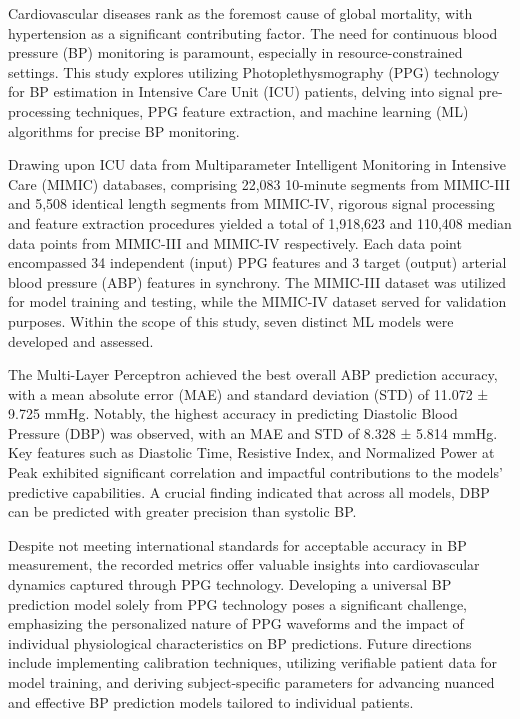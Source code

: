     Cardiovascular diseases rank as the foremost cause of global mortality, with hypertension as a significant contributing factor.
    The need for continuous blood pressure (BP) monitoring is paramount, especially in resource-constrained settings.
    This study explores utilizing Photoplethysmography (PPG) technology for BP estimation in Intensive Care Unit (ICU) patients, delving into signal pre-processing techniques,
    PPG feature extraction, and machine learning (ML) algorithms for precise BP monitoring.

    \vspace{0.4cm}

    Drawing upon ICU data from Multiparameter Intelligent Monitoring in Intensive Care (MIMIC) databases, comprising 22,083 10-minute segments from MIMIC-III and 5,508 identical length segments from MIMIC-IV,
    rigorous signal processing and feature extraction procedures yielded a total of 1,918,623 and 110,408 median data points from MIMIC-III and MIMIC-IV respectively.
    Each data point encompassed 34 independent (input) PPG features and 3 target (output) arterial blood pressure (ABP) features in synchrony.
    The MIMIC-III dataset was utilized for model training and testing, while the MIMIC-IV dataset served for validation purposes.
    Within the scope of this study, seven distinct ML models were developed and assessed.

    \vspace{0.4cm}

    The Multi-Layer Perceptron achieved the best overall ABP prediction accuracy, with a mean absolute error (MAE) and standard deviation (STD) of 11.072 ± 9.725 mmHg.
    Notably, the highest accuracy in predicting Diastolic Blood Pressure (DBP) was observed, with an MAE and STD of 8.328 ± 5.814 mmHg.
    Key features such as Diastolic Time, Resistive Index, and Normalized Power at Peak exhibited significant correlation and impactful contributions to the models' predictive capabilities.
    A crucial finding indicated that across all models, DBP can be predicted with greater precision than systolic BP\@.

    \vspace{0.4cm}

    Despite not meeting international standards for acceptable accuracy in BP measurement, the recorded metrics offer valuable insights into cardiovascular dynamics captured through PPG technology.
    Developing a universal BP prediction model solely from PPG technology poses a significant challenge, emphasizing the personalized nature of PPG waveforms
    and the impact of individual physiological characteristics on BP predictions.
    Future directions include implementing calibration techniques, utilizing verifiable patient data for model training, and deriving subject-specific parameters
    for advancing nuanced and effective BP prediction models tailored to individual patients.